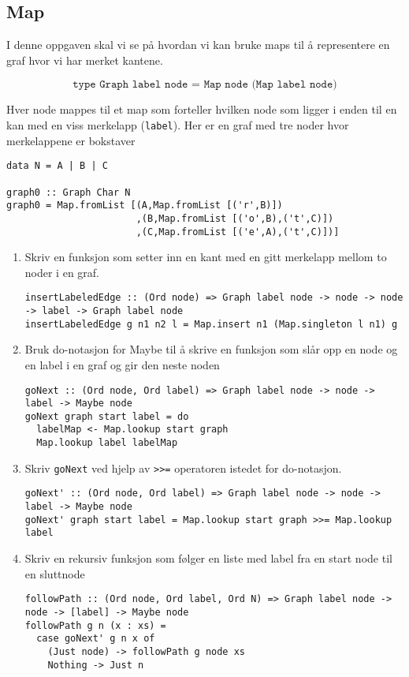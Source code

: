 \documentclass{article}
\begin{document}
    \subsection{Map}
    I denne oppgaven skal vi se på hvordan vi kan bruke maps til å representere en graf hvor vi har merket kantene.

    \[ \texttt{type Graph label node = Map node (Map label node)} \]

    Hver node mappes til et map som forteller hvilken node som ligger i enden til en kan med en viss merkelapp (\texttt{label}). Her er en graf med tre noder hvor merkelappene er bokstaver

    \begin{lstlisting}
data N = A | B | C 

graph0 :: Graph Char N
graph0 = Map.fromList [(A,Map.fromList [('r',B)])
                       ,(B,Map.fromList [('o',B),('t',C)])
                       ,(C,Map.fromList [('e',A),('t',C)])]
    \end{lstlisting}


    \begin{enumerate}[label=\alph*)]
        \item Skriv en funksjon som setter inn en kant med en gitt merkelapp mellom to noder i en graf.
            \begin{lstlisting}
insertLabeledEdge :: (Ord node) => Graph label node -> node -> node -> label -> Graph label node
insertLabeledEdge g n1 n2 l = Map.insert n1 (Map.singleton l n1) g
            \end{lstlisting}
        \item Bruk do-notasjon for Maybe til å skrive en funksjon som slår opp en node og en label i en graf og gir den neste noden

            \begin{lstlisting}
goNext :: (Ord node, Ord label) => Graph label node -> node -> label -> Maybe node
goNext graph start label = do
  labelMap <- Map.lookup start graph
  Map.lookup label labelMap
            \end{lstlisting}

        \item Skriv \texttt{goNext} ved hjelp av \texttt{>>=} operatoren istedet for do-notasjon.

            \begin{lstlisting}
goNext' :: (Ord node, Ord label) => Graph label node -> node -> label -> Maybe node
goNext' graph start label = Map.lookup start graph >>= Map.lookup label
            \end{lstlisting}
        \item Skriv en rekursiv funksjon som følger en liste med label fra en start node til en sluttnode

            \begin{lstlisting}
followPath :: (Ord node, Ord label, Ord N) => Graph label node -> node -> [label] -> Maybe node
followPath g n (x : xs) =
  case goNext' g n x of
    (Just node) -> followPath g node xs
    Nothing -> Just n
            \end{lstlisting}

    \end{enumerate}
\end{document}
